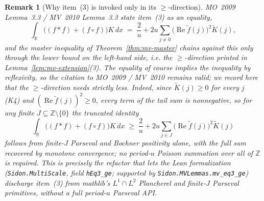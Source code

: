 \documentclass[11pt, letterpaper]{article}
\theoremstyle{paperplain}
\theoremstyle{paperdef}
\newtheorem{remark}[theorem]{Remark}
\newcommand{\R}{\mathbb{R}}
\newcommand{\Z}{\mathbb{Z}}
\begin{document}
\begin{remark}[Why item~(3) is invoked only in its $\ge$-direction]
\label{rem:eq3-inequality}
MO~2009 Lemma~3.3 / MV~2010 Lemma~3.3 state item~(3) as an
\emph{equality},
\[
  \int_{\R}\bigl((f*f)+(f\circ f)\bigr)K\,dx
  \;=\;\frac{2}{u}+2u\sum_{j\ne 0}\bigl(\operatorname{Re}\widetilde{f}(j)\bigr)^{2}\widetilde{K}(j),
\]
and the master inequality of Theorem~\ref{thm:mv-master} chains
against this only through the lower bound on the left-hand side, i.e.
the $\ge$-direction printed in Lemma~\ref{lem:mv-extension}(3).  The
equality of course implies the inequality by reflexivity, so the
citation to MO~2009 / MV~2010 remains valid; we record here that the
$\ge$-direction needs strictly less.  Indeed, since
$\widetilde{K}(j)\ge 0$ for every $j$ (K4) and $(\operatorname{Re}\widetilde{f}(j))^{2}\ge 0$,
every term of the tail sum is nonnegative, so for any finite
$J\subseteq\Z\setminus\{0\}$ the truncated identity
\[
  \int_{\R}\bigl((f*f)+(f\circ f)\bigr)K\,dx
  \;\ge\;\frac{2}{u}+2u\sum_{j\in J}\bigl(\operatorname{Re}\widetilde{f}(j)\bigr)^{2}\widetilde{K}(j)
\]
follows from finite-$J$ Parseval and Bochner positivity alone, with
the full sum recovered by monotone convergence; no period-$u$ Poisson
summation over all of $\Z$ is required.  This is precisely the
refactor that lets the Lean formalization
(\texttt{Sidon.MultiScale}, field \texttt{hEq3\_ge}; supported by
\texttt{Sidon.MVLemmas.mv\_eq3\_ge}) discharge item~(3) from
mathlib's $L^{1}\cap L^{2}$ Plancherel and finite-$J$ Parseval
primitives, without a full period-$u$ Parseval API.
\end{remark}
\end{document}
